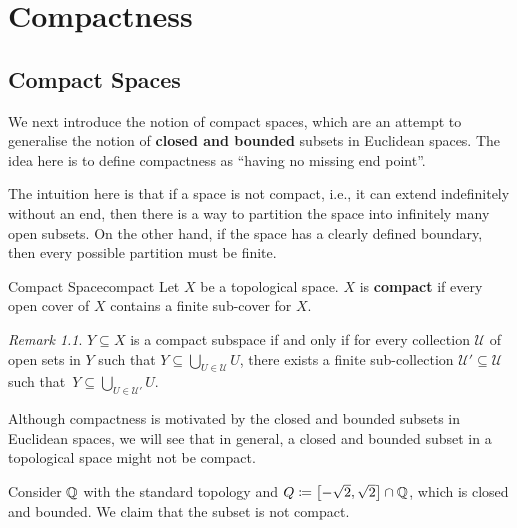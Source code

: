 \documentclass[math]{amznotes}
\theoremstyle{remark}
\newtheorem*{remark}{Remark}
\begin{document}
\chapter{Compactness}
\section{Compact Spaces}
We next introduce the notion of compact spaces, which are an attempt to generalise the notion of \textbf{closed and bounded} subsets in Euclidean spaces. The idea here is to define compactness as ``having no missing end point''.

The intuition here is that if a space is not compact, i.e., it can extend indefinitely without an end, then there is a way to partition the space into infinitely many open subsets. On the other hand, if the space has a clearly defined boundary, then every possible partition must be finite.
\begin{dfnbox}{Compact Space}{compact}
    Let $X$ be a topological space. $X$ is {\color{red} \textbf{compact}} if every open cover of $X$ contains a finite sub-cover for $X$.
\end{dfnbox}
\begin{notebox}
    \begin{remark}
        $Y \subseteq X$ is a compact subspace if and only if for every collection $\mathcal{U}$ of open sets in $Y$ such that $Y \subseteq \bigcup_{U \in \mathcal{U}}U$, there exists a finite sub-collection $\mathcal{U}' \subseteq \mathcal{U}$ such that~$Y \subseteq \bigcup_{U \in \mathcal{U}'}U$.
    \end{remark}
\end{notebox}
Although compactness is motivated by the closed and bounded subsets in Euclidean spaces, we will see that in general, a closed and bounded subset in a topological space might not be compact.

Consider $\mathbb{Q}$ with the standard topology and $Q \coloneqq \left[-\sqrt{2}, \sqrt{2}\right] \cap \mathbb{Q}$, which is closed and bounded. We claim that the subset is not compact.
\end{document}
